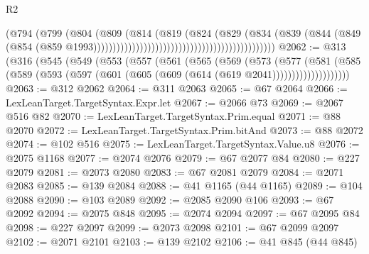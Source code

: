 \begin{lexlean}{R2}
\begin{coremodule}
                                                                      (@794
                                                                        (@799
                                                                          (@804
                                                                            (@809
                                                                              (@814
                                                                                (@819
                                                                                  (@824
                                                                                    (@829
                                                                                      (@834
                                                                                        (@839
                                                                                          (@844
                                                                                            (@849
                                                                                              (@854
                                                                                                (@859
                                                                                                  @1993)))))))))))))))))))))))))))))))))))))))))))))))
@2062 := @313
    (@316
      (@545
        (@549
          (@553
            (@557
              (@561
                (@565
                  (@569
                    (@573
                      (@577
                        (@581
                          (@585
                            (@589
                              (@593 (@597 (@601 (@605 (@609 (@614 (@619 @2041))))))))))))))))))))
@2063 := @312 @2062
@2064 := @311 @2063
@2065 := @67 @2064
@2066 := LexLeanTarget.TargetSyntax.Expr.let
@2067 := @2066 @73
@2069 := @2067 @516 @82
@2070 := LexLeanTarget.TargetSyntax.Prim.equal
@2071 := @88 @2070
@2072 := LexLeanTarget.TargetSyntax.Prim.bitAnd
@2073 := @88 @2072
@2074 := @102 @516
@2075 := LexLeanTarget.TargetSyntax.Value.u8
@2076 := @2075 @1168
@2077 := @2074 @2076
@2079 := @67 @2077 @84
@2080 := @227 @2079
@2081 := @2073 @2080
@2083 := @67 @2081 @2079
@2084 := @2071 @2083
@2085 := @139 @2084
@2088 := @41 @1165 (@44 @1165)
@2089 := @104 @2088
@2090 := @103 @2089
@2092 := @2085 @2090 @106
@2093 := @67 @2092
@2094 := @2075 @848
@2095 := @2074 @2094
@2097 := @67 @2095 @84
@2098 := @227 @2097
@2099 := @2073 @2098
@2101 := @67 @2099 @2097
@2102 := @2071 @2101
@2103 := @139 @2102
@2106 := @41 @845 (@44 @845)

\end{coremodule}
\end{lexlean}
